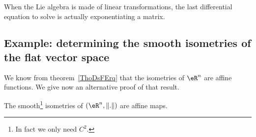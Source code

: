\begin{remark}
    When the Lie algebra is made of linear transformations, the last differential equation to solve is actually exponentiating a matrix.
\end{remark}

\subsection{Example: determining the smooth isometries of the flat vector space}

We know from theorem~\ref{ThoDsFErq} that the isometries of \( \eR^n\) are affine functions. We give now an alternative proof of that result.

\begin{proposition}     \label{PROPooDVIWooAFDNPy}
    The smooth\footnote{In fact we only need \( C^2\).} isometries of \( (\eR^n,\| . \|)  \)  are affine maps.
\end{proposition}

